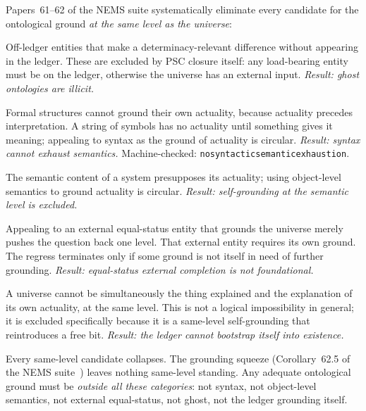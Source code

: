 \documentclass[11pt]{article}
\theoremstyle{remark}
\newcommand{\lean}[1]{%
  \penalty-100
  \begingroup\def\_{\textunderscore\allowbreak}\texttt{#1}\endgroup}
\begin{document}
Papers~61--62 of the NEMS suite systematically eliminate every candidate for the
ontological ground \emph{at the same level as the universe}:

\medskip
\begin{termlist}
  \item[Ghost ontologies (P61~\cite{SpivackNEMS61})]
    Off-ledger entities that make a determinacy-relevant difference without appearing
    in the ledger. These are excluded by PSC closure itself: any load-bearing entity
    must be on the ledger, otherwise the universe has an external input. \emph{Result:
    ghost ontologies are illicit.}

  \item[Syntax (P53~\cite{SpivackNEMS53})]
    Formal structures cannot ground their own actuality, because actuality precedes
    interpretation. A string of symbols has no actuality until something gives it
    meaning; appealing to syntax as the ground of actuality is circular.
    \emph{Result: syntax cannot exhaust semantics.} Machine-checked:
    \lean{no\_syntactic\allowbreak\_semantic\_exhaustion}.

  \item[Object-level semantics]
    The semantic content of a system presupposes its actuality; using object-level
    semantics to ground actuality is circular. \emph{Result: self-grounding at the
    semantic level is excluded.}

  \item[Equal-status external completion (P23)]
    Appealing to an external equal-status entity that grounds the universe merely
    pushes the question back one level. That external entity requires its own ground.
    The regress terminates only if some ground is not itself in need of further grounding.
    \emph{Result: equal-status external completion is not foundational.}

  \item[Self-actualizing ledger (P62~\cite{SpivackNEMS62})]
    A universe cannot be simultaneously the thing explained and the explanation of its
    own actuality, at the same level. This is not a logical impossibility in general;
    it is excluded specifically because it is a same-level self-grounding that
    reintroduces a free bit. \emph{Result: the ledger cannot bootstrap itself into
    existence.}
\end{termlist}

\medskip
Every same-level candidate collapses. The grounding squeeze (Corollary~62.5 of
the NEMS suite~\cite{SpivackNEMS62}) leaves nothing same-level standing. Any adequate ontological ground
must be \emph{outside all these categories}: not syntax, not object-level semantics,
not external equal-status, not ghost, not the ledger grounding itself.
\end{document}
